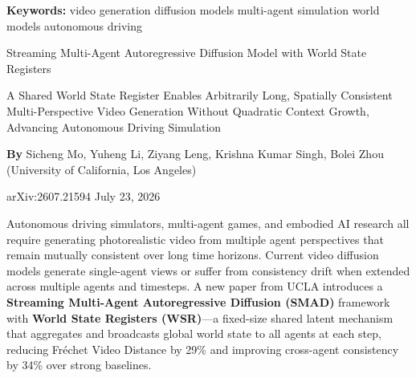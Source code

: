 \documentclass[10pt,twocolumn]{article}
\begin{document}
\setlength{\parindent}{0pt}
\setlength{\parskip}{4pt}

{\small\color{keywordgray}\textbf{Keywords:}
  video generation \textbullet{}
  diffusion models \textbullet{}
  multi-agent simulation \textbullet{}
  world models \textbullet{}
  autonomous driving}\par\vspace{4pt}

{\LARGE\bfseries\raggedright
  Streaming Multi-Agent Autoregressive Diffusion Model
  with World State Registers}\par\vspace{4pt}

{\large\itshape\raggedright
  A Shared World State Register Enables Arbitrarily Long, Spatially
  Consistent Multi-Perspective Video Generation Without Quadratic
  Context Growth, Advancing Autonomous Driving Simulation}\par\vspace{6pt}

{\small\textbf{By} Sicheng Mo, Yuheng Li, Ziyang Leng, Krishna Kumar
  Singh, Bolei Zhou (University of California, Los Angeles)}\par\vspace{2pt}

{\small\color{keywordgray}arXiv:2607.21594 \textbullet{} July 23, 2026}
\par\vspace{2pt}\noindent{\color{rulered}\rule{\columnwidth}{0.6pt}}\vspace{6pt}

Autonomous driving simulators, multi-agent games, and embodied AI
research all require generating photorealistic video from multiple
agent perspectives that remain mutually consistent over long time
horizons. Current video diffusion models generate single-agent
views or suffer from consistency drift when extended across multiple
agents and timesteps. A new paper from UCLA introduces a
\textbf{Streaming Multi-Agent Autoregressive Diffusion (SMAD)} framework
with \textbf{World State Registers (WSR)}---a fixed-size shared
latent mechanism that aggregates and broadcasts global world state
to all agents at each step, reducing Fréchet Video Distance by 29\%
and improving cross-agent consistency by 34\% over strong baselines.
\end{document}
